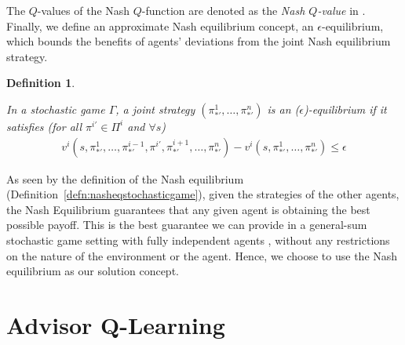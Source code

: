 \documentclass[jair, twoside,11pt,theapa]{article}
\newtheorem{defn}{Definition}
\begin{document}
\noindent The $Q$-values of the Nash $Q$-function are denoted as the \emph{Nash $Q$-value} in \citet{hu2003nash}. Finally, we define an approximate Nash equilibrium concept, an $\epsilon$-equilibrium, which bounds the benefits of agents' deviations from the joint Nash equilibrium strategy.
\begin{defn}\label{def:epsionadvisorq}

In a stochastic game $\Gamma$, a joint strategy $(\pi^{1}_{*'}, \ldots, \pi^{n}_{*'})$ is an  ($\epsilon$)-equilibrium if it satisfies (for all $\pi^{i'} \in \Pi^i$ and $\forall s$)
\begin{equation}
    \begin{array}{l}
        v^i(s, \pi^1_{*'}, \ldots, \pi^{i-1}_{*'}, \pi^{i'}, \pi^{i+1}_{*'}, \ldots, \pi^n_{*'}) 
      - v^i(s, \pi^1_{*'}, \ldots, \pi^n_{*'})  \leq \epsilon
    \end{array}
\end{equation}
\end{defn}

As seen by the definition of the Nash equilibrium (Definition~\ref{defn:nasheqstochasticgame}), given the strategies of the other agents, the Nash Equilibrium guarantees that any given agent is obtaining the best possible payoff. This is the best guarantee we can provide in a general-sum stochastic game setting with fully independent agents \cite{hu2003nash}, without any restrictions on the nature of the environment or the agent. Hence, we choose to use the Nash equilibrium as our solution concept. 









\section{Advisor Q-Learning}\label{sec:advisorqlearning}
\end{document}
